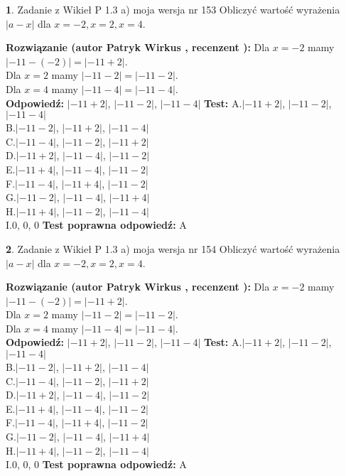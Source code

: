 \documentclass[12pt, a4paper]{article}
\theoremstyle{definition} %
\newtheorem{zad}{}
\newcommand{\zadStart}[1]{\begin{zad}#1\newline}
\newcommand{\zadStop}{\end{zad}}
\newcommand{\rozwStart}[2]{\noindent \textbf{Rozwiązanie (autor #1 , recenzent #2): }\newline}
\newcommand{\rozwStop}{\newline}
\newcommand{\odpStart}{\noindent \textbf{Odpowiedź:}\newline}
\newcommand{\odpStop}{\newline}
\newcommand{\testStart}{\noindent \textbf{Test:}\newline}
\newcommand{\testStop}{\newline}
\newcommand{\kluczStart}{\noindent \textbf{Test poprawna odpowiedź:}\newline}
\newcommand{\kluczStop}{\newline}
\begin{document}
\zadStart{Zadanie z Wikieł P 1.3 a) moja wersja nr 153}
Obliczyć wartość wyrażenia $|a - x|$ dla $x=-2,x=2,x=4$.
\zadStop
\rozwStart{Patryk Wirkus}{}
Dla $x = -2$ mamy $|-11 - (-2)| = |-11 + 2|$.\\
Dla $x = 2$ mamy $|-11 - 2| = |-11 - 2|$.\\
Dla $x = 4$ mamy $|-11 - 4| = |-11 - 4|$.\\
\rozwStop
\odpStart
$|-11 + 2|$, $|-11 - 2|$, $|-11 - 4|$
\odpStop
\testStart
A.$|-11 + 2|$, $|-11 - 2|$, $|-11 - 4|$\\
B.$|-11 - 2|$, $|-11 + 2|$, $|-11 - 4|$\\
C.$|-11 - 4|$, $|-11 - 2|$, $|-11 + 2|$\\
D.$|-11 + 2|$, $|-11 - 4|$, $|-11 - 2|$\\
E.$|-11 + 4|$, $|-11 - 4|$, $|-11 - 2|$\\
F.$|-11 - 4|$, $|-11 + 4|$, $|-11 - 2|$\\
G.$|-11 - 2|$, $|-11 - 4|$, $|-11 + 4|$\\
H.$|-11 + 4|$, $|-11 - 2|$, $|-11 - 4|$\\
I.$0$, $0$, $0$
\testStop
\kluczStart
A
\kluczStop



\zadStart{Zadanie z Wikieł P 1.3 a) moja wersja nr 154}
Obliczyć wartość wyrażenia $|a - x|$ dla $x=-2,x=2,x=4$.
\zadStop
\rozwStart{Patryk Wirkus}{}
Dla $x = -2$ mamy $|-11 - (-2)| = |-11 + 2|$.\\
Dla $x = 2$ mamy $|-11 - 2| = |-11 - 2|$.\\
Dla $x = 4$ mamy $|-11 - 4| = |-11 - 4|$.\\
\rozwStop
\odpStart
$|-11 + 2|$, $|-11 - 2|$, $|-11 - 4|$
\odpStop
\testStart
A.$|-11 + 2|$, $|-11 - 2|$, $|-11 - 4|$\\
B.$|-11 - 2|$, $|-11 + 2|$, $|-11 - 4|$\\
C.$|-11 - 4|$, $|-11 - 2|$, $|-11 + 2|$\\
D.$|-11 + 2|$, $|-11 - 4|$, $|-11 - 2|$\\
E.$|-11 + 4|$, $|-11 - 4|$, $|-11 - 2|$\\
F.$|-11 - 4|$, $|-11 + 4|$, $|-11 - 2|$\\
G.$|-11 - 2|$, $|-11 - 4|$, $|-11 + 4|$\\
H.$|-11 + 4|$, $|-11 - 2|$, $|-11 - 4|$\\
I.$0$, $0$, $0$
\testStop
\kluczStart
A
\kluczStop
\end{document}
